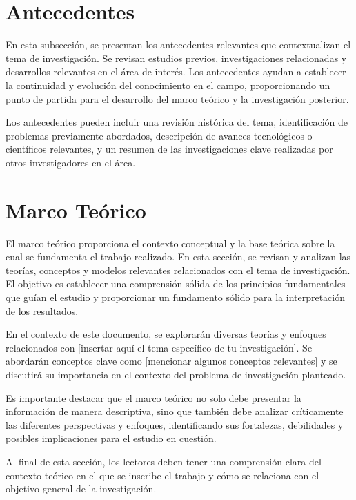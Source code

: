\section{Antecedentes}

En esta subsección, se presentan los antecedentes relevantes que contextualizan el tema de investigación. Se revisan estudios previos, investigaciones relacionadas y desarrollos relevantes en el área de interés. Los antecedentes ayudan a establecer la continuidad y evolución del conocimiento en el campo, proporcionando un punto de partida para el desarrollo del marco teórico y la investigación posterior.

Los antecedentes pueden incluir una revisión histórica del tema, identificación de problemas previamente abordados, descripción de avances tecnológicos o científicos relevantes, y un resumen de las investigaciones clave realizadas por otros investigadores en el área.

\section{Marco Teórico}

El marco teórico proporciona el contexto conceptual y la base teórica sobre la cual se fundamenta el trabajo realizado. En esta sección, se revisan y analizan las teorías, conceptos y modelos relevantes relacionados con el tema de investigación. El objetivo es establecer una comprensión sólida de los principios fundamentales que guían el estudio y proporcionar un fundamento sólido para la interpretación de los resultados.

En el contexto de este documento, se explorarán diversas teorías y enfoques relacionados con [insertar aquí el tema específico de tu investigación]. Se abordarán conceptos clave como [mencionar algunos conceptos relevantes] y se discutirá su importancia en el contexto del problema de investigación planteado.

Es importante destacar que el marco teórico no solo debe presentar la información de manera descriptiva, sino que también debe analizar críticamente las diferentes perspectivas y enfoques, identificando sus fortalezas, debilidades y posibles implicaciones para el estudio en cuestión.

Al final de esta sección, los lectores deben tener una comprensión clara del contexto teórico en el que se inscribe el trabajo y cómo se relaciona con el objetivo general de la investigación.

\newpage